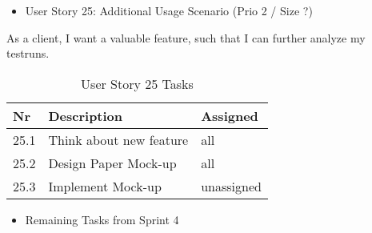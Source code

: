 \begin{itemize}
	\item User Story 25: Additional Usage Scenario (Prio 2 / Size ?)
	\end{itemize}
As a client, I want a valuable feature, such that I can further analyze my testruns.
\begin{table}[h]
  \caption{User Story 25 Tasks}
  \label{Story 23 Tasks}
  \centering
  \begin{tabular}{p{1cm}|p{5cm}|p{3cm}|}
  	Nr & Description & Assigned \\ 
  	\hline
  	25.1 & Think about new feature & all \\ 
  	\hline
  	25.2 & Design Paper Mock-up & all \\ 
  	\hline
  	25.3 & Implement Mock-up & unassigned \\ 
  	\hline
  \end{tabular}
\end{table}

\begin{itemize}
	\item Remaining Tasks from Sprint 4
	\end{itemize}

